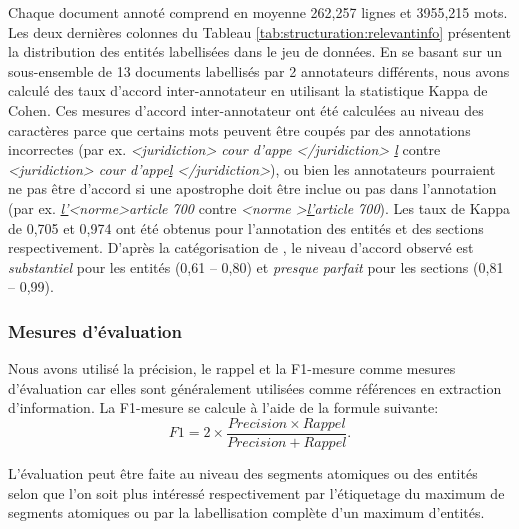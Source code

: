 Chaque document annoté comprend en moyenne 262,257 lignes et 3955,215 mots. Les deux dernières colonnes du Tableau \ref{tab:structuration:relevantinfo} présentent la distribution des entités labellisées dans le jeu de données. En se basant sur un sous-ensemble de 13 documents labellisés par 2 annotateurs différents, nous avons calculé des taux d'accord inter-annotateur en utilisant la statistique Kappa de Cohen. Ces mesures d'accord inter-annotateur ont été calculées au niveau des caractères parce que certains mots peuvent être coupés par des annotations incorrectes (par ex. \textit{<juridiction> cour d'appe </juridiction> \underline{l}} contre \textit{<juridiction> cour d'appe\underline{l} </juridiction>}), ou bien les annotateurs pourraient ne pas être d'accord si une apostrophe doit être inclue ou pas dans l'annotation (par ex. \textit{ \underline{l'}<norme>article 700} contre \textit{ <norme >\underline{l'}article 700}). Les taux de Kappa de 0,705 et 0,974 ont été obtenus pour l'annotation des entités et des sections respectivement. D'après la catégorisation de \citet{viera2005kappa}, le niveau d'accord observé est \textit{substantiel} pour les entités (0,61 -- 0,80) et \textit{presque parfait} pour les sections (0,81 -- 0,99).

\subsubsection{Mesures d'évaluation}
Nous avons utilisé la précision, le rappel et la F1-mesure comme mesures d'évaluation car elles sont généralement utilisées comme références en extraction d'information. %
La F1-mesure se calcule à l'aide de la formule suivante:  
\[F1 = 2 \times \frac{Precision \times Rappel} {Precision + Rappel}.\]

L'évaluation peut être faite au niveau des segments atomiques ou  des entités selon que l'on soit plus intéressé respectivement par l'étiquetage  du maximum de segments atomiques ou par la labellisation complète d'un maximum d'entités.


